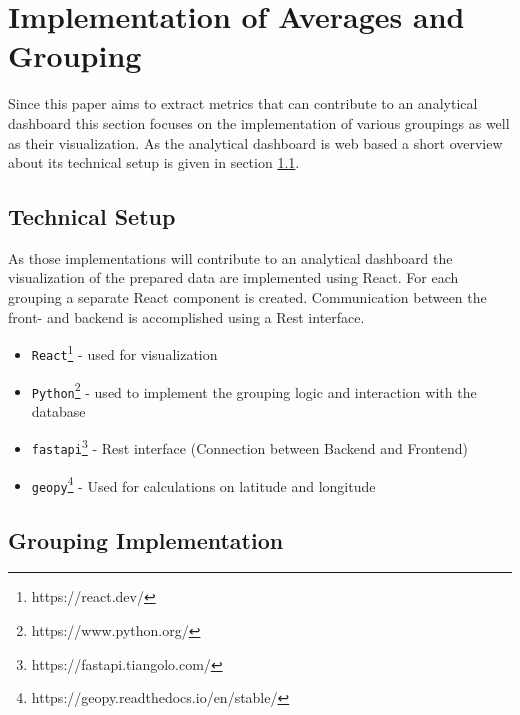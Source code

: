 %
%
% 
% 
% 

\chapter{Implementation of Averages and Grouping}
\label{chap:analytical_dashboard}
Since this paper aims to extract metrics that can contribute to an analytical dashboard this section focuses on the implementation of various groupings as well as their visualization. As the analytical dashboard is web based a short overview about its technical setup is given in section \ref{sec:tech_set}.

\section{Technical Setup}
\label{sec:tech_set}
As those implementations will contribute to an analytical dashboard the visualization of the prepared data are implemented using React. For each grouping a separate React component is created. Communication between the front- and backend is accomplished using a Rest interface. 

\begin{itemize}
\item  \verb|React|\footnote{https://react.dev/} - used for visualization
\item \verb|Python|\footnote{https://www.python.org/} - used to implement the grouping logic and interaction with the database
\item \verb|fastapi|\footnote{https://fastapi.tiangolo.com/} - Rest interface (Connection between Backend and Frontend) 
\item \verb|geopy|\footnote{https://geopy.readthedocs.io/en/stable/} - Used for calculations on latitude and longitude 
\end{itemize}
\section{Grouping Implementation}

